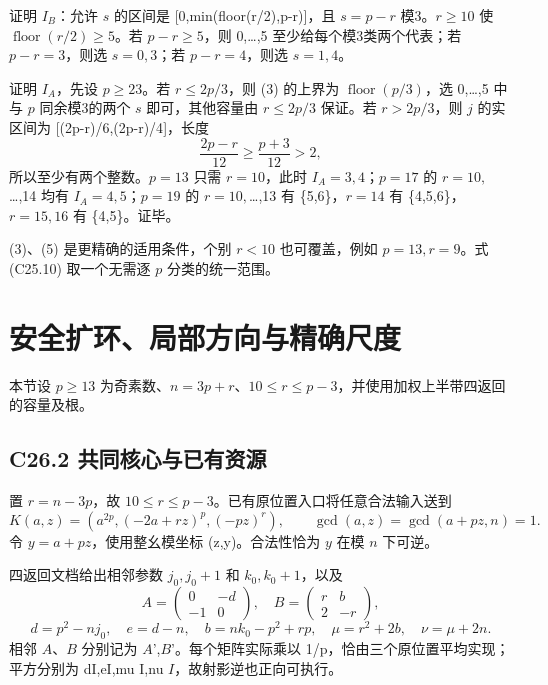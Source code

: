 \documentclass[11pt,a4paper]{article}
\theoremstyle{definition}
\numberwithin{equation}{section}
\begin{document}
{证明} {\ensuremath{I_{B}}：允许} {\ensuremath{s}} {的区间是} {{[}0,min(floor(r/2),p-r){]}，且} {\ensuremath{s=p-r}} {模3。\ensuremath{r\ge 10}} {使} {\ensuremath{\operatorname{floor}(r/2)\ge 5}。若} {\ensuremath{p-r\ge 5}，则} {0,\ldots,5} {至少给每个模3类两个代表；若} {\ensuremath{p-r=3}，则选} {\ensuremath{s=0,3}；若} {\ensuremath{p-r=4}，则选} {\ensuremath{s=1,4}。}

{证明} {\ensuremath{I_{A}}，先设} {\ensuremath{p\ge 23}。若} {\ensuremath{r\le 2p/3}，则} {(3)} {的上界为} {\ensuremath{\operatorname{floor}(p/3)}，选} {0,\ldots,5} {中与} {\ensuremath{p}} {同余模3的两个} {\ensuremath{s}} {即可，其他容量由} {\ensuremath{r\le 2p/3}} {保证。若} {\ensuremath{r>2p/3}，则} {\ensuremath{j}} {的实区间为} {{[}(2p-r)/6,(2p-r)/4{]}，长度} \[
\frac{2p-r}{12}\ge\frac{p+3}{12}>2,
\] {所以至少有两个整数。\ensuremath{p=13}} {只需} {\ensuremath{r=10}，此时} {\ensuremath{I_{A}={3,4}}；\ensuremath{p=17}} {的} {\ensuremath{r=10,}\ldots,14} {均有} {\ensuremath{I_{A}={4,5}}；\ensuremath{p=19}} {的} {\ensuremath{r=10,}\ldots,13} {有} {\{5,6\}，\ensuremath{r=14}} {有} {\{4,5,6\}，\ensuremath{r=15,16}} {有} {\{4,5\}。证毕。}

{(3)、(5)} {是更精确的适用条件，个别} {\ensuremath{r<10}} {也可覆盖，例如} {\ensuremath{p=13,r=9}。式} {(C25.10)} {取一个无需逐} {\ensuremath{p}} {分类的统一范围。}


\section{安全扩环、局部方向与精确尺度}\label{construct:upper-local}
{本节设} \(p\ge13\) {为奇素数、}\(n=3p+r\){、}\(10\le r\le p-3\){，并使用加权上半带四返回的容量及根。}

\subsection*{\texorpdfstring{{C26.2} {共同核心与已有资源}}{C26.2 共同核心与已有资源}}\label{C26-h158}

{置} {\ensuremath{r=n-3p}，故} {\ensuremath{10\le r\le p-3}。已有原位置入口将任意合法输入送到} \[
K(a,z)=(a^{2p},(-2a+rz)^p,(-pz)^r),\qquad
\gcd(a,z)=\gcd(a+pz,n)=1.
\] {令} {\ensuremath{y=a+pz}，使用整幺模坐标} {(z,y)。合法性恰为} {\ensuremath{y}} {在模} {\ensuremath{n}} {下可逆。}

{四返回文档给出相邻参数} {\ensuremath{j_{0},j_{0}+1}} {和} {\ensuremath{k_{0},k_{0}+1}，以及} \[
A=\begin{pmatrix}0&-d\\-1&0\end{pmatrix},\quad
B=\begin{pmatrix}r&b\\2&-r\end{pmatrix},
\] \[
d=p^2-nj_0,\quad e=d-n,\quad
b=nk_0-p^2+rp,\quad \mu=r^2+2b,\quad\nu=\mu+2n.
\] {相邻} {\ensuremath{A}、\ensuremath{B}} {分别记为} {\ensuremath{A}',\ensuremath{B}'。每个矩阵实际乘以} {1/p，恰由三个原位置平均实现；平方分别为} {dI,eI,mu} {I,nu} {\ensuremath{I}，故射影逆也正向可执行。}
\end{document}
